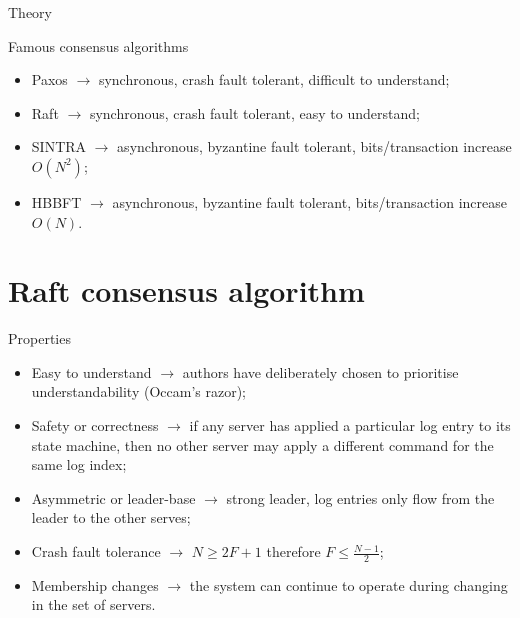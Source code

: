 \documentclass[presentation]{beamer}\mode<presentation>{\usetheme{AMSBolognaFC}}
\begin{document}
\begin{frame}[allowframebreaks]{Theory}
    \framebreak

    \begin{block}{Famous consensus algorithms}
        \begin{itemize}
            \item Paxos  $\rightarrow$ synchronous, crash fault tolerant, difficult to understand;
            \item Raft  $\rightarrow$ synchronous, crash fault tolerant, easy to understand;
            \item SINTRA  $\rightarrow$ asynchronous, byzantine fault tolerant, bits/transaction increase $O(N^2)$;
            \item HBBFT  $\rightarrow$  asynchronous, byzantine fault tolerant, bits/transaction increase $O(N)$.
        \end{itemize}
    \end{block}
\end{frame}

\section{Raft consensus algorithm}

\begin{frame}{Properties}
    \begin{itemize}
        \item Easy to understand $\rightarrow$ authors have deliberately chosen to prioritise understandability (Occam's razor);
        \item Safety or correctness $\rightarrow$ if any server has applied a particular log entry to its state machine, then no other server may apply a different command for the same log index;
        \item Asymmetric or leader-base $\rightarrow$ strong leader, log entries only flow from the leader to the other serves;
        \item Crash fault tolerance $\rightarrow$ $N \ge 2F + 1$ therefore $F \le \frac{N - 1}{2}$;
        \item Membership changes $\rightarrow$ the system can continue to operate during changing in the set of servers.
    \end{itemize}
\end{frame}
\end{document}
